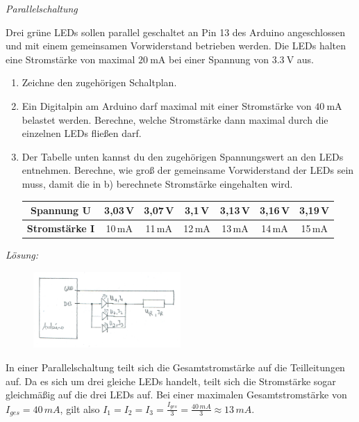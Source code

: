 \documentclass[ngerman, 11pt]{scrreprt}
\begin{document}
	\begin{aufgabe} \emph{Parallelschaltung}
		
		Drei grüne LEDs sollen parallel geschaltet an Pin 13 des Arduino angeschlossen und mit einem gemeinsamen Vorwiderstand betrieben werden. Die LEDs halten eine Stromstärke von maximal $\SI{20}{\milli\ampere}$ bei einer Spannung von $\SI{3,3}{\volt}$ aus.
		
		\begin{enumerate}[label=\alph*), itemsep=0ex]
			\item Zeichne den zugehörigen Schaltplan.
			\item Ein Digitalpin am Arduino darf maximal mit einer Stromstärke von $\SI{40}{\milli\ampere}$ belastet werden. Berechne, welche Stromstärke dann maximal durch die einzelnen LEDs fließen darf.
			\item Der Tabelle unten kannst du den zugehörigen Spannungswert an den LEDs entnehmen. Berechne, wie groß der gemeinsame Vorwiderstand der LEDs sein muss, damit die in b) berechnete Stromstärke eingehalten wird.
			
			\begin{tabular}{c | c | c | c | c | c | c}
				\hline
				\textbf{Spannung U} & 3,03\,V & 3,07\,V & 3,1\,V & 3,13\,V & 3,16\,V & 3,19\,V \\ \hline
				\textbf{Stromstärke I} & 10\,mA & 11\,mA & 12\,mA & 13\,mA & 14\,mA & 15\,mA  \\ \hline
			\end{tabular}
		\end{enumerate}
	\end{aufgabe}

	\bigskip
	\emph{Lösung:}
	
	\begin{figure}[H]
		\centering
		\includegraphics[width=0.5\textwidth]{../pics/uebung-parallel-schaltplan.png}
	\end{figure}

	In einer Parallelschaltung teilt sich die Gesamtstromstärke auf die Teilleitungen auf. Da es sich um drei gleiche LEDs handelt, teilt sich die Stromstärke sogar gleichmäßig auf die drei LEDs auf. Bei einer maximalen Gesamtstromstärke von $I_{ges}=40\,mA$, gilt also $I_1 = I_2 = I_3 = \frac{I_{ges}}{3} = \frac{40\,mA}{3}\approx 13\,mA$.
	
\end{document}
